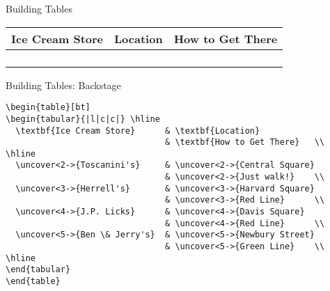 \documentclass[pdf]{beamer}
\begin{document}
\begin{frame}{Building Tables}
\begin{table}[bt]
\begin{tabular}{|l|c|c|} \hline
\textbf{Ice Cream Store} & \textbf{Location} & \textbf{How to Get There} \\ \hline
\uncover<2->{Toscanini's} & \uncover<2->{Central Square} & \uncover<2->{Just walk!} \\
\uncover<3->{Herrell's} & \uncover<3->{Harvard Square} & \uncover<3->{Red Line} \\
\uncover<4->{J.P. Licks} & \uncover<4->{Davis Square} & \uncover<4->{Red Line} \\
\uncover<5->{Ben \& Jerry's} & \uncover<5->{Newbury Street} & \uncover<5->{Green Line} \\ \hline
\end{tabular}
\end{table}


\end{frame}

\begin{frame}[fragile]{Building Tables: Backstage}
\begin{scriptsize}
\begin{verbatim}
\begin{table}[bt]
\begin{tabular}{|l|c|c|} \hline
  \textbf{Ice Cream Store}      & \textbf{Location} 
                                & \textbf{How to Get There}   \\ \hline
  \uncover<2->{Toscanini's}     & \uncover<2->{Central Square} 
                                & \uncover<2->{Just walk!}    \\
  \uncover<3->{Herrell's}       & \uncover<3->{Harvard Square} 
                                & \uncover<3->{Red Line}      \\
  \uncover<4->{J.P. Licks}      & \uncover<4->{Davis Square} 
                                & \uncover<4->{Red Line}      \\
  \uncover<5->{Ben \& Jerry's}  & \uncover<5->{Newbury Street} 
                                & \uncover<5->{Green Line}    \\ \hline
\end{tabular}
\end{table}
\end{verbatim}
\end{scriptsize}
\end{frame}
\end{document}
